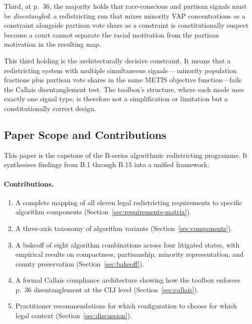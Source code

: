 Third, at p.~36, the majority holds that race-conscious and partisan signals
must be \emph{disentangled}: a redistricting run that mixes minority VAP
concentrations as a constraint alongside partisan vote share as a constraint
is constitutionally suspect because a court cannot separate the racial motivation
from the partisan motivation in the resulting map.

This third holding is the architecturally decisive constraint.
It means that a redistricting system with multiple simultaneous signals---
minority population fractions plus partisan vote shares in the same METIS
objective function---fails the Callais disentanglement test.
The toolbox's structure, where each mode uses exactly one signal type, is
therefore not a simplification or limitation but a constitutionally correct design.

\subsection{Paper Scope and Contributions}

This paper is the capstone of the B-series algorithmic redistricting programme.
It synthesises findings from B.1 through B.15 into a unified framework.

\paragraph{Contributions.}
\begin{enumerate}
  \item A complete mapping of all eleven legal redistricting requirements to
    specific algorithm components (Section~\ref{sec:requirements-matrix}).
  \item A three-axis taxonomy of algorithm variants (Section~\ref{sec:components}).
  \item A bakeoff of eight algorithm combinations across four litigated states,
    with empirical results on compactness, partisanship, minority representation,
    and county preservation (Section~\ref{sec:bakeoff}).
  \item A formal Callais compliance architecture showing how the toolbox
    enforces p.~36 disentanglement at the CLI level (Section~\ref{sec:callais}).
  \item Practitioner recommendations for which configuration to choose for which
    legal context (Section~\ref{sec:discussion}).
\end{enumerate}

